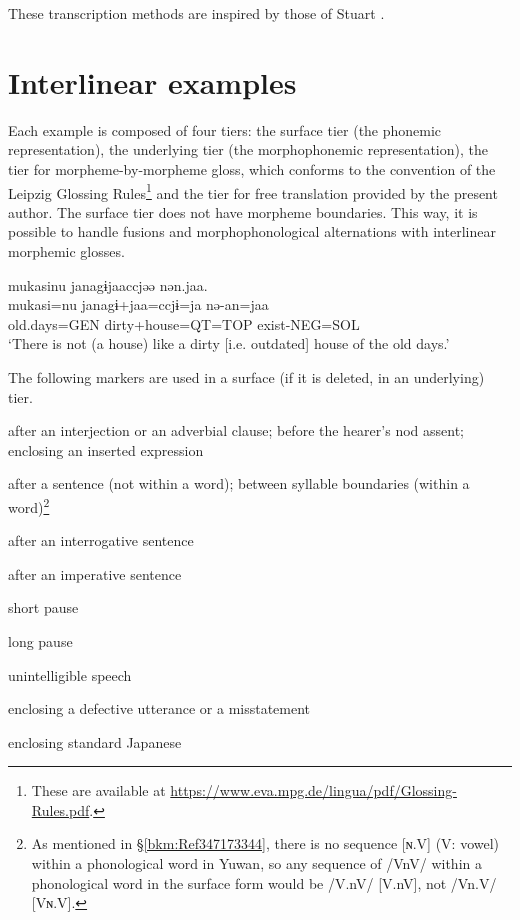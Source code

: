 
These transcription methods are inspired by those of Stuart \citet[7--9, 43--52]{McGill2009}.

\section*{Interlinear examples}

Each example is composed of four tiers: the surface tier (the phonemic representation), the underlying tier (the morphophonemic representation), the tier for morpheme-by-morpheme gloss, which conforms to the convention of the Leipzig Glossing Rules\footnote{These are available at \url{https://www.eva.mpg.de/lingua/pdf/Glossing-Rules.pdf}.} and the tier for free translation provided by the present author. The surface tier does not have morpheme boundaries. This way, it is possible to handle fusions and morphophonological alternations with interlinear morphemic glosses.

\ea
\glll mukasinu janagɨjaaccjəə nən.jaa.\\
      mukasi=nu  janagɨ+jaa=ccjɨ=ja  nə-an=jaa\\
      old.days=GEN dirty+house=QT=TOP exist-NEG=SOL\\
\glt  ‘There is not (a house) like a dirty [i.e. outdated] house of the old days.’
\z 

The following markers are used in a surface (if it is deleted, in an underlying) tier.

\begin{description}[font=\normalfont]
\item[,]  after an interjection or an adverbial clause; before the hearer’s nod assent; enclosing an inserted expression
\item[.]  after a sentence (not within a word); between syllable boundaries (within a word)\footnote{As mentioned in §\ref{bkm:Ref347173344}, there is no sequence [ɴ.V] (V: vowel) within a phonological word in Yuwan, so any sequence of /VnV/ within a phonological word in the surface form would be /V.nV/ [V.nV], not /Vn.V/ [Vɴ.V].}
\item[?]  after an interrogative sentence
\item[!]  after an imperative sentence
\item[..]  short pause
\item[...]  long pause
\item[xxx]  unintelligible speech
\item[(  )] enclosing a defective utterance or a misstatement
\item[{\textbar}  {\textbar}]  enclosing standard Japanese
\end{description} 


